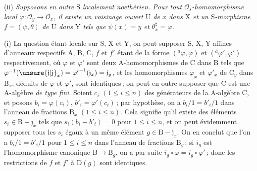 (ii) \textit{Supposons en outre $\mathrm{S}$ localement noethérien. Pour tout $\mathcal{O}_s$-homomorphisme local $\varphi:\mathcal{O}_y\to\mathcal{O}_x$, il existe un voisinage ouvert $\mathrm{U}$ de $x$ dans $\mathrm{X}$ et un $\mathrm{S}$-morphisme $f=(\psi,\theta)$ de $\mathrm{U}$ dans $\mathrm{Y}$ tels que $\psi(x)=y$ et $\theta_x^{\sharp}=\varphi$.}

(i) La question étant locale sur $\mathrm{S}$, $\mathrm{X}$ et $\mathrm{Y}$, on peut supposer $\mathrm{S}$, $\mathrm{X}$, $\mathrm{Y}$ affines d’anneaux respectifs $\mathrm{A}$, $\mathrm{B}$, $\mathrm{C}$, $f$ et $f'$ étant de la forme $({}^{a}\varphi,\widetilde{\varphi})$ et $({}^{a}\varphi',\widetilde{\varphi}')$ respectivement, où $\varphi$ et $\varphi'$ sont deux $\mathrm{A}$-homomorphismes de $\mathrm{C}$ dans $\mathrm{B}$ tels que $\varphi^{-1}(\unsure{\mathfrak{j}|\mathrm{j}}_x)={\varphi'}^{-1}(\mathfrak{j}_x)=\mathfrak{j}_y$, et les homomorphismes $\varphi_x$ et $\varphi'_x$ de $\mathrm{C}_y$ dans $\mathrm{B}_x$, déduits de $\varphi$ et $\varphi'$, sont identiques\,; on peut en outre supposer que $\mathrm{C}$ est une $\mathrm{A}$-algèbre \textit{de type fini}. Soient $c_i$ $(1\leqslant i\leqslant n)$ des générateurs de la $\mathrm{A}$-algèbre $\mathrm{C}$, et posons $b_i=\varphi(c_i)$, $b'_i=\varphi'(c_i)$\,; par hypothèse, on a $b_i/1=b'_i/1$ dans l’anneau de fractions $\mathrm{B}_x$ $(1\leqslant i\leqslant n)$. Cela signifie qu’il existe des éléments $s_i\in \mathrm{B}-\mathfrak{j}_x$ tels que $s_i(b_i-b'_i)=0$ pour $1\leqslant i\leqslant n$, et on peut évidemment supposer tous les $s_i$ égaux à un même élément $g\in \mathrm{B}-\mathfrak{j}_x$. On en conclut que l’on a $b_i/1=b'_i/1$ pour $1\leqslant i\leqslant n$ dans l’anneau de fractions $\mathrm{B}_g$\,; si $i_g$ est l’homomorphisme canonique $\mathrm{B}\to \mathrm{B}_g$, on a par suite $i_g\circ\varphi=i_g\circ\varphi'$\,; donc les restrictions de $f$ et $f'$ à $\mathrm{D}(g)$ sont identiques.

